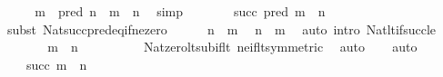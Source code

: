 \begin{isabellebody}
\ \ \isamarkupfalse%
\ \isamarkupfalse%
\ {\isachardoublequoteopen}m\ {\isacharminus}{\kern0pt}\ pred\ n\ {\isacharequal}{\kern0pt}\ m\ {\isacharminus}{\kern0pt}\ n{\isacharprime}{\kern0pt}{\isachardoublequoteclose}\ \isamarkupfalse%
\ simp\isanewline
\ \ \isamarkupfalse%
\ \isamarkupfalse%
\ {\isachardoublequoteopen}{\isachardot}{\kern0pt}{\isachardot}{\kern0pt}{\isachardot}{\kern0pt}\ {\isacharequal}{\kern0pt}\ succ\ {\isacharparenleft}{\kern0pt}pred\ {\isacharparenleft}{\kern0pt}m\ {\isacharminus}{\kern0pt}\ n{\isacharprime}{\kern0pt}{\isacharparenright}{\kern0pt}{\isacharparenright}{\kern0pt}{\isachardoublequoteclose}\isanewline
\ \ \isamarkupfalse%
\ {\isacharparenleft}{\kern0pt}subst\ Nat{\isacharunderscore}{\kern0pt}succ{\isacharunderscore}{\kern0pt}pred{\isacharunderscore}{\kern0pt}eq{\isacharunderscore}{\kern0pt}if{\isacharunderscore}{\kern0pt}ne{\isacharunderscore}{\kern0pt}zero{\isacharparenright}{\kern0pt}\isanewline
\ \ \ \ \isamarkupfalse%
\ {\isacartoucheopen}n\ {\isasymle}\ m{\isacartoucheclose}\ \isamarkupfalse%
\ {\isachardoublequoteopen}n{\isacharprime}{\kern0pt}\ {\isacharless}{\kern0pt}\ m{\isachardoublequoteclose}\ \isamarkupfalse%
\ {\isacharparenleft}{\kern0pt}auto\ intro{\isacharcolon}{\kern0pt}\ Nat{\isacharunderscore}{\kern0pt}lt{\isacharunderscore}{\kern0pt}if{\isacharunderscore}{\kern0pt}succ{\isacharunderscore}{\kern0pt}le{\isacharparenright}{\kern0pt}\isanewline
\ \ \ \ \isamarkupfalse%
\ \isamarkupfalse%
\ {\isachardoublequoteopen}m\ {\isacharminus}{\kern0pt}\ n{\isacharprime}{\kern0pt}\ {\isasymnoteq}\ {}{\isachardoublequoteclose}\isanewline
\ \ \ \ \ \ \isamarkupfalse%
\ Nat{\isacharunderscore}{\kern0pt}zero{\isacharunderscore}{\kern0pt}lt{\isacharunderscore}{\kern0pt}sub{\isacharunderscore}{\kern0pt}if{\isacharunderscore}{\kern0pt}lt\ ne{\isacharunderscore}{\kern0pt}if{\isacharunderscore}{\kern0pt}lt{\isacharbrackleft}{\kern0pt}symmetric{\isacharbrackright}{\kern0pt}\ \isamarkupfalse%
\ auto\isanewline
\ \ \isamarkupfalse%
\ auto\isanewline
\ \ \isamarkupfalse%
\ \isamarkupfalse%
\ {\isachardoublequoteopen}{\isachardot}{\kern0pt}{\isachardot}{\kern0pt}{\isachardot}{\kern0pt}\ \ {\isacharequal}{\kern0pt}\ succ\ {\isacharparenleft}{\kern0pt}m\ {\isacharminus}{\kern0pt}\ n{\isacharparenright}{\kern0pt}{\isachardoublequoteclose}\ \isamarkupfalse%

\end{isabellebody}
